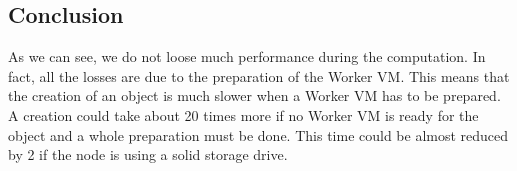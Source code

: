\subsection{Conclusion}
As we can see, we do not loose much performance during the computation. In fact, all the losses are due to the preparation of the Worker VM. This means that the creation of an object is much slower when a Worker VM has to be prepared. A creation could take about 20 times more if no Worker VM is ready for the object and a whole preparation must be done. This time could be almost reduced by 2 if the node is using a solid storage drive. 

